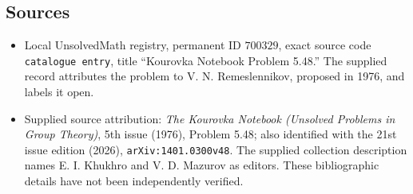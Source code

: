 \documentclass[11pt]{article}
\begin{document}
\subsection{Sources}
\begin{itemize}
\item Local UnsolvedMath registry, permanent ID \(700329\), exact source code \texttt{catalogue entry}, title ``Kourovka Notebook Problem 5.48.'' The supplied record attributes the problem to V. N. Remeslennikov, proposed in 1976, and labels it open.
\item Supplied source attribution: \emph{The Kourovka Notebook (Unsolved Problems in Group Theory)}, 5th issue (1976), Problem 5.48; also identified with the 21st issue edition (2026), \texttt{arXiv:1401.0300v48}. The supplied collection description names E. I. Khukhro and V. D. Mazurov as editors. These bibliographic details have not been independently verified.
\end{itemize}
\end{document}
